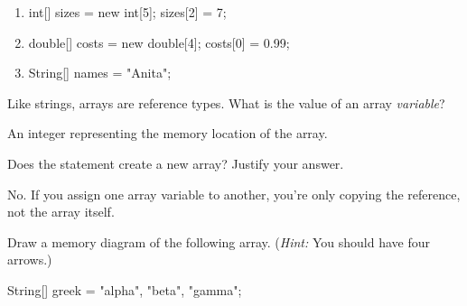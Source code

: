 \begin{minipage}{0.46\linewidth}

\begin{enumerate}

\item
\begin{javalst}
int[] sizes = new int[5];
sizes[2] = 7;
\end{javalst}

\item
\begin{javalst}
double[] costs = new double[4];
costs[0] = 0.99;
\end{javalst}

\item
\begin{javalst}
String[] names = {"Anita"};
\end{javalst}

\end{enumerate}

\end{minipage}
\hfill
\begin{minipage}{0.53\linewidth}
\end{minipage}


\Q Like strings, arrays are reference types. What is the value of an array {\it variable}?

\begin{answer}[3em]
An integer representing the memory location of the array.
\end{answer}


\Q Does the statement  create a new array? Justify your answer.

\begin{answer}[3em]
No. If you assign one array variable to another, you're only copying the reference, not the array itself.
\end{answer}


\Q Draw a memory diagram of the following array.
(\textit{Hint:} You should have four arrows.)

\begin{javalst}
String[] greek = {"alpha", "beta", "gamma"};
\end{javalst}

\vspace{1em}
\hspace{2em}
